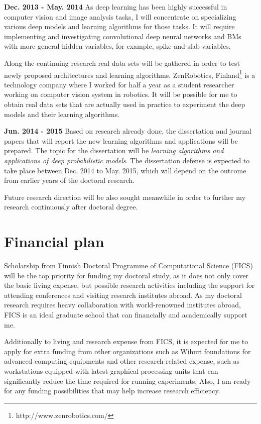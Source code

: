 \documentclass[11pt, oneside]{essay}
\begin{document}
\textbf{Dec. 2013 - May. 2014} As deep learning has been
highly successful in computer vision and image analysis
tasks, I will concentrate on specializing various deep
models and learning algorithms for those tasks. It will
require implementing and investigating convolutional deep
neural networks and BMs with more general hidden variables,
for example, spike-and-slab variables.

Along the continuing research real data sets will be
gathered in order to test newly proposed architectures and
learning algorithms. ZenRobotics,
Finland\footnote{http://www.zenrobotics.com/} is a
technology company where I worked for half a year as a
student researcher working on computer vision system in
robotics. It will be possible for me to obtain real data
sets that are actually used in practice to experiment the
deep models and their learning algorithms.

\textbf{Jun. 2014 - 2015} Based on research already done,
the dissertation and journal papers that will report the new
learning algorithms and applications will be prepared. The
topic for the dissertation will be \emph{learning algorithms
and applications of deep probabilistic models}. The
dissertation defense is expected to take place between Dec.
2014 to May. 2015, which will depend on the outcome from
earlier years of the doctoral research.

Future research direction will be also sought meanwhile in
order to further my research continuously after doctoral
degree.

\section{Financial plan}

Scholarship from Finnish Doctoral Programme of Computational Science
(FICS) will be the top priority for funding my doctoral
study, as it does not only cover the basic living expense,
but possible research activities including the support for
attending conferences and visiting research institutes
abroad. As my doctoral research requires heavy collaboration
with world-renowned institutes abroad, FICS is an ideal
graduate school that can financially and academically
support me. 

Additionally to living and research expense from FICS, it is
expected for me to apply for extra funding from other
organizations such as Wihuri foundations for advanced
computing equipments and other research-related expense,
such as workstations equipped with latest graphical
processing units that can significantly reduce the time
required for running experiments. Also, I am ready for any
funding possibilities that may help increase research
efficiency.

\small


\end{document}
